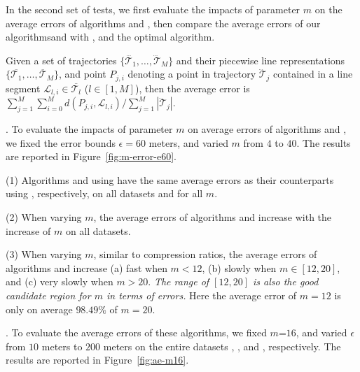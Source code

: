 In the second set of tests, we first evaluate the impacts of parameter $m$ on the average errors of algorithms \cist and \cista, then compare the average errors of our algorithms\cist and \cista with \dps, \squishe and the optimal algorithm.

Given a set of trajectories $\{\dddot{\mathcal{T}_1}, \ldots, \dddot{\mathcal{T}}_M\}$ and their piecewise line representations $\{\overline{\mathcal{T}_1}, \ldots, \overline{\mathcal{T}}_M\}$, and point $P_{j,i}$ denoting
a point in trajectory $\dddot{\mathcal{T}}_j$ contained in a line segment $\mathcal{L}_{l,i}\in\overline{\mathcal{T}_l}$ ($l\in[1,M]$),
then the average error is $\sum_{j=1}^{M}\sum_{i=0}^{M} d(P_{j,i},
\mathcal{L}_{l,i})/\sum_{j=1}^{M}{|\dddot{\mathcal{T}}_j |}$.




.
To evaluate the impacts of parameter $m$ on average errors of algorithms \cist and \cista, we fixed the error bounds {$\epsilon =60$ meters}, and varied $m$ from $4$ to $40$. The results are reported in Figure~\ref{fig:m-error-e60}.



\ni(1) Algorithms \cist and \cista using \rpia have the same average errors as their counterparts using \cpia, respectively, on all datasets and for all $m$.

\ni(2) When varying $m$, the average errors of algorithms \cist and \cista increase with the increase of $m$ on all datasets.

\ni(3) When varying $m$, similar to compression ratios, the average errors of
algorithms \cist and \cista increase (a) fast when $m < 12$, (b) slowly when $m
\in [12, 20]$, and (c) very slowly when $m > 20$.
\emph{The range of $[12, 20]$ is also the good candidate region for $m$ in terms of errors.}
Here the average error of $m=12$ is only on average {$98.49\%$} of $m=20$.




.
To evaluate the average errors of these algorithms, we fixed {$m$=$16$}, and
varied $\epsilon$ from $10$ meters to $200$ meters on the entire
{datasets} \sercar, \geolife, \mopsi and \pricar, respectively.
The results are reported in Figure~\ref{fig:ae-m16}.

